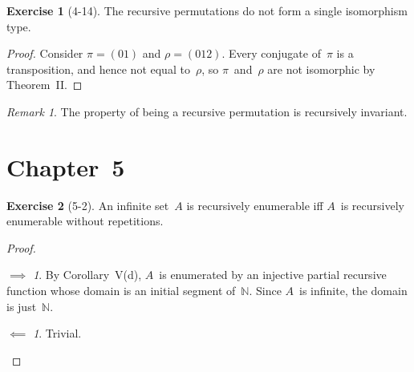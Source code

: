 \documentclass[letterpaper]{article}
\newcommand{\N}{\mathbb{N}}
\theoremstyle{definition}
\newtheorem*{exer}{Exercise}
\theoremstyle{remark}
\newtheorem*{rmk}{Remark}
\theoremstyle{direction}
\newtheorem*{fwd}{$\implies$}
\newtheorem*{bwd}{$\impliedby$}
\begin{document}
\begin{exer}[4-14]
The recursive permutations do not form a single isomorphism type.
\end{exer}
\begin{proof}
Consider $\pi=(01)$ and $\rho=(012)$. Every conjugate of~$\pi$ is a transposition, and hence not equal to~$\rho$, so $\pi$~and~$\rho$ are not isomorphic by Theorem~II.
\end{proof}
\begin{rmk}
The property of being a recursive permutation is recursively invariant.
\end{rmk}

\newpage
\section*{Chapter~5}
\begin{exer}[5-2]
An infinite set~$A$ is recursively enumerable iff $A$~is recursively enumerable without repetitions.
\end{exer}
\begin{proof}
\begin{fwd}
By Corollary~V(d), $A$~is enumerated by an injective partial recursive function whose domain is an initial segment of~$\N$. Since $A$~is infinite, the domain is just~$\N$.
\end{fwd}
\begin{bwd}
Trivial.\qedhere
\end{bwd}
\end{proof}
\end{document}
